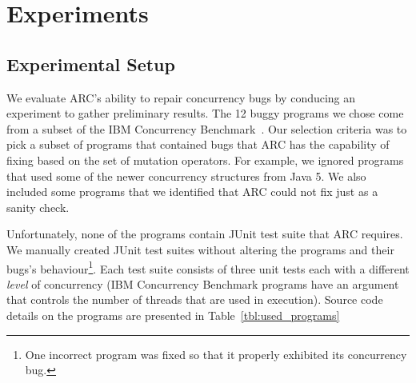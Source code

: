 \section{Experiments}
\label{sec:experiments}


\subsection{Experimental Setup}
\label{sec:experimental_setup}

We evaluate ARC's ability to repair concurrency bugs by conducing an experiment
to gather preliminary results. The 12 buggy programs we chose come from a
subset of the IBM Concurrency Benchmark~\cite{EHSU06}. Our selection criteria
was to pick a subset of programs that contained bugs that ARC has the
capability of fixing based on the set of mutation operators. For example, we
ignored programs that used some of the newer concurrency structures from Java 5. We
also included some programs that we identified that ARC could not fix just as a
sanity check.

Unfortunately, none of the programs contain JUnit test suite that ARC requires.
We manually created JUnit test suites without altering the programs and their
bugs's behaviour\footnote{One incorrect program was fixed so that it properly
exhibited its concurrency bug.}. Each test suite consists of three unit tests
each with a different \textit{level} of concurrency (IBM Concurrency Benchmark
programs have an argument that controls the number of threads that are used in
execution). Source code details on the programs are presented in
Table~\ref{tbl:used_programs}

